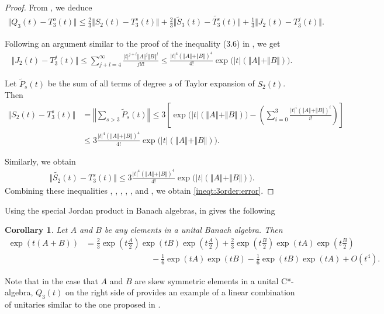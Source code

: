 \documentclass{article}
\theoremstyle{plain} %
\newtheorem{cor}[thm]{Corollary}
\numberwithin{equation}{section}
\begin{document}
\begin{proof}
From , we deduce
\begin{align}
\Vert Q_3(t)-T_3^o(t) \Vert\leq \frac{2}{3}\Vert S_2(t)-T_3^s(t)\Vert+\frac{2}{3}\Vert \widetilde{S}_3(t)-\widetilde{T_3^s}(t)\Vert+\frac{1}{3}\Vert J_2(t)-T_3^j(t)\Vert	\label{inqt:Q3:T3o}.
\end{align}

Following an argument similar to the proof of the inequality (3.6) in \cite{chehade:wang:wang:2024:suzuki}, we get
\begin{align}
\Vert J_2(t)-T_3^j(t) \Vert \leq \sum_{j+l=4}^{\infty}\frac{\vert t\vert^{j+l} \Vert A\Vert^j\Vert B\Vert^l}{j!l!}	\leq \frac{\vert t\vert^4(\Vert A\Vert +\Vert B\Vert)^4}{4!}\exp\big(\vert t\vert (\Vert A\Vert +\Vert B\Vert)\big) \label{inqt:T3j} .
\end{align}

Let $\widetilde{P}_s(t)$ be the sum of all terms of degree $s$ of Taylor expansion of $S_2(t)$. Then
\begin{align}
\Vert S_2(t)-T_3^s(t)\Vert&=\left\Vert \sum_{s>3}\widetilde{P}_s(t) \right \Vert \leq 3\left[\exp\big(\vert t\vert(\Vert A\Vert +\Vert B\Vert)\big)-\left(\sum_{i=0}^3\frac{\vert t\vert^i(\Vert A\Vert +\Vert B\Vert)^i}{i!}\right)\right ]\nonumber\\
&\leq 3\frac{\vert t\vert^4(\Vert A\Vert +\Vert B\Vert)^4}{4!}\exp\big(\vert t\vert (\Vert A\Vert +\Vert B\Vert)\big)\label{inqt:T3s}.
\end{align}


Similarly, we obtain
\begin{align}
\Vert \widetilde{S_2}(t)-T_3^s(t)\Vert\leq  3\frac{\vert t\vert^4(\Vert A\Vert +\Vert B\Vert)^4}{4!}\exp\big(\vert t\vert (\Vert A\Vert +\Vert B\Vert)\big)\label{inqt:tT3s}.
\end{align}
Combining these inequalities , , , , , and  , we obtain \eqref{ineqt:3order:error}.
\end{proof}
    
Using the special Jordan product in Banach algebras,  in  gives the following
\begin{cor}\label{cor:3order:product:associative}
Let $A$ and $B$ be any elements in a unital Banach algebra. 
Then 
\begin{align}
 \exp\left(t(A+B)\right)&=\frac{2}{3}\exp\left(t \frac{A}{2} \right)\exp\left(tB\right)\exp\left(t\frac{A}{2}\right)+\frac{2}{3}\exp\left(t\frac{B}{2}\right)\exp\left(tA\right)\exp\left(t\frac{B}{2}\right)\nonumber\\
&\quad\quad\quad\quad\quad\quad\quad\quad-\frac{1}{6}\exp(tA)\exp(tB)-\frac{1}{6} \exp(tB) \exp(tA) +O(t^4)\label{eqt:3order:product}.
 \end{align}
\end{cor}
Note that in the case that $A$ and $B$ are skew symmetric elements in a unital C*-algebra, $Q_3(t)$ on the right side of  provides an example of a linear combination of unitaries similar to the one proposed in \cite{childs:wiebe:2012:hamiltonian}.
\end{document}
